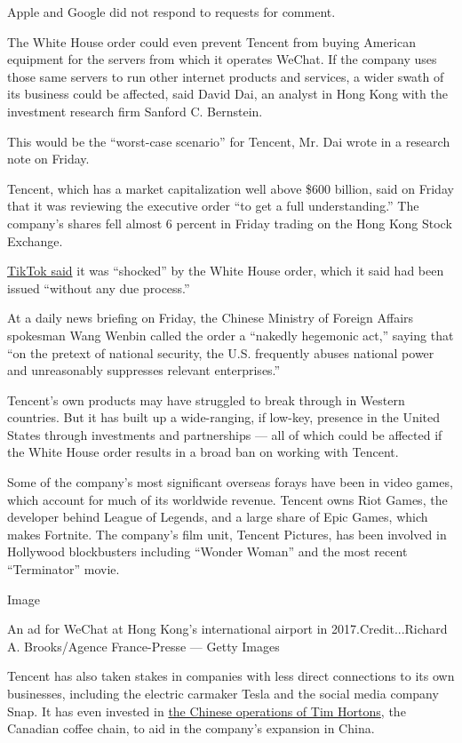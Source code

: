 Apple and Google did not respond to requests for comment.

The White House order could even prevent Tencent from buying American
equipment for the servers from which it operates WeChat. If the company
uses those same servers to run other internet products and services, a
wider swath of its business could be affected, said David Dai, an
analyst in Hong Kong with the investment research firm Sanford C.
Bernstein.

This would be the ``worst-case scenario'' for Tencent, Mr. Dai wrote in
a research note on Friday.

Tencent, which has a market capitalization well above \$600 billion,
said on Friday that it was reviewing the executive order ``to get a full
understanding.'' The company's shares fell almost 6 percent in Friday
trading on the Hong Kong Stock Exchange.

\href{https://newsroom.tiktok.com/en-us/tiktok-responds}{TikTok said} it
was ``shocked'' by the White House order, which it said had been issued
``without any due process.''

At a daily news briefing on Friday, the Chinese Ministry of Foreign
Affairs spokesman Wang Wenbin called the order a ``nakedly hegemonic
act,'' saying that ``on the pretext of national security, the U.S.
frequently abuses national power and unreasonably suppresses relevant
enterprises.''

Tencent's own products may have struggled to break through in Western
countries. But it has built up a wide-ranging, if low-key, presence in
the United States through investments and partnerships --- all of which
could be affected if the White House order results in a broad ban on
working with Tencent.

Some of the company's most significant overseas forays have been in
video games, which account for much of its worldwide revenue. Tencent
owns Riot Games, the developer behind League of Legends, and a large
share of Epic Games, which makes Fortnite. The company's film unit,
Tencent Pictures, has been involved in Hollywood blockbusters including
``Wonder Woman'' and the most recent ``Terminator'' movie.

Image

An ad for WeChat at Hong Kong's international airport in
2017.Credit...Richard A. Brooks/Agence France-Presse --- Getty Images

Tencent has also taken stakes in companies with less direct connections
to its own businesses, including the electric carmaker Tesla and the
social media company Snap. It has even invested in
\href{https://weibo.com/6969784101/J1y7JuKuM?from=page_1006066969784101_profile\&wvr=6\&mod=weibotime}{the
Chinese operations of Tim Hortons}, the Canadian coffee chain, to aid in
the company's expansion in China.

